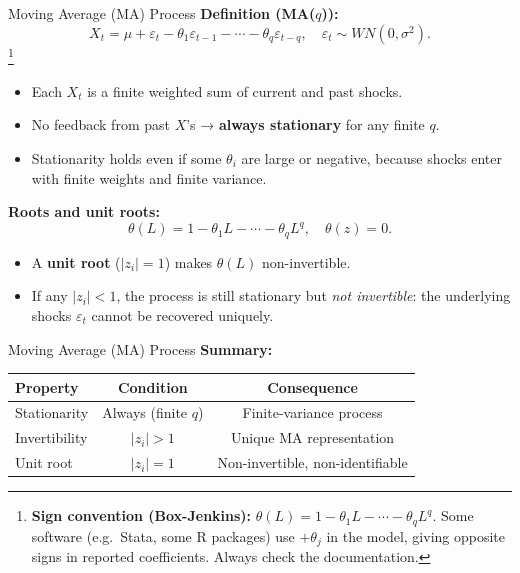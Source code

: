\documentclass{beamer}
\begin{document}
\begin{frame}{Moving Average (MA) Process}
\footnotesize
\textbf{Definition (MA($q$)):}
\[
X_t = \mu + \varepsilon_t - \theta_1 \varepsilon_{t-1} - \cdots - \theta_q \varepsilon_{t-q}, 
\quad \varepsilon_t \sim WN(0,\sigma^2).
\]
\footnote{\scriptsize \textbf{Sign convention (Box-Jenkins):} $\theta(L)=1-\theta_1 L-\cdots-\theta_q L^q$. Some software (e.g.\ Stata, some R packages) use $+\theta_j$ in the model, giving opposite signs in reported coefficients. Always check the documentation.}

\begin{itemize}
    \item Each $X_t$ is a finite weighted sum of current and past shocks.
    \item No feedback from past $X$’s → \textbf{always stationary} for any finite $q$.
    \item Stationarity holds even if some $\theta_i$ are large or negative, because 
    shocks enter with finite weights and finite variance.
\end{itemize}

\textbf{Roots and unit roots:}
\[
\theta(L) = 1 - \theta_1 L - \cdots - \theta_q L^q,
\quad \theta(z) = 0.
\]
\begin{itemize}
    \item A \textbf{unit root} ($|z_i|=1$) makes $\theta(L)$ non-invertible.
    \item If any $|z_i|<1$, the process is still stationary but \emph{not invertible}: the underlying shocks $\varepsilon_t$ cannot be recovered uniquely.
\end{itemize}
\end{frame}

\begin{frame}{Moving Average (MA) Process}
\textbf{Summary:}
\begin{center}
\begin{tabular}{lcc}
\toprule
Property & Condition & Consequence \\
\midrule
Stationarity & Always (finite $q$) & Finite-variance process \\
Invertibility & $|z_i|>1$ & Unique MA representation \\
Unit root & $|z_i|=1$ & Non-invertible, non-identifiable \\
\bottomrule
\end{tabular}
\end{center}
\end{frame}
\end{document}
